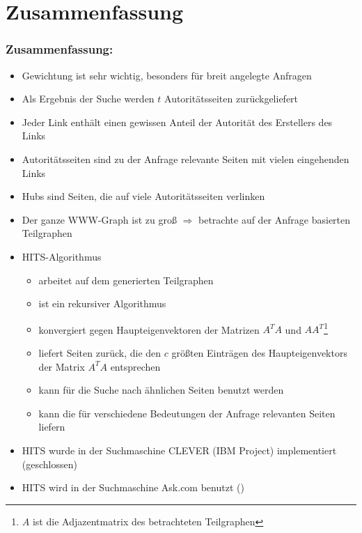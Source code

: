 \documentclass[hyperref={pdfpagelabels=false}]{beamer}
\begin{document}


\section{Zusammenfassung}

\begin{frame}[allowframebreaks]
\frametitle{Zusammenfassung:}

\begin{itemize}
	\item Gewichtung ist sehr wichtig, besonders für breit angelegte Anfragen
	\item Als Ergebnis der Suche werden $t$ Autoritätsseiten zurückgeliefert
	\item Jeder Link enthält einen gewissen Anteil der Autorität des Erstellers des Links
	\item Autoritätsseiten sind zu der Anfrage relevante Seiten mit vielen eingehenden Links
	\item Hubs sind Seiten, die auf viele Autoritätsseiten verlinken
	\item Der ganze WWW-Graph ist zu groß $\Rightarrow$ betrachte auf der Anfrage basierten Teilgraphen
\end{itemize}

\framebreak

\begin{itemize}
\item HITS-Algorithmus
	\begin{itemize}
		\item arbeitet auf dem generierten Teilgraphen
		\item ist ein rekursiver Algorithmus
		\item konvergiert gegen Haupteigenvektoren der Matrizen $A^TA$ und $AA^T$\footnote{$A$ ist die Adjazentmatrix des betrachteten Teilgraphen}
		\item liefert Seiten zurück, die den $c$ größten Einträgen des Haupteigenvektors der Matrix $A^TA$ entsprechen
		\item kann für die Suche nach ähnlichen Seiten benutzt werden
		\item kann die für verschiedene Bedeutungen der Anfrage relevanten Seiten liefern
	\end{itemize}
\item HITS wurde in der Suchmaschine CLEVER (IBM Project) implementiert (geschlossen)
\item HITS wird in der Suchmaschine Ask.com benutzt (\cite{HITS_Lecture4_Cornell})
\end{itemize}
\end{frame}
\end{document}
